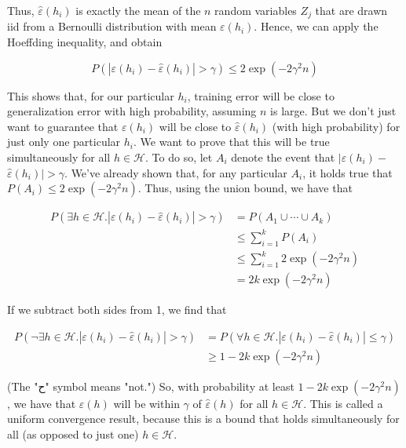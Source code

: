 \documentclass[10pt]{article}
\begin{document}
Thus, \(\hat{\varepsilon}\left(h_{i}\right)\) is exactly the mean of the \(n\) random variables \(Z_{j}\) that are drawn iid from a Bernoulli distribution with mean \(\varepsilon\left(h_{i}\right)\). Hence, we can apply the Hoeffding inequality, and obtain

\[
P\left(\left|\varepsilon\left(h_{i}\right)-\hat{\varepsilon}\left(h_{i}\right)\right|>\gamma\right) \leq 2 \exp \left(-2 \gamma^{2} n\right)
\]

This shows that, for our particular \(h_{i}\), training error will be close to generalization error with high probability, assuming \(n\) is large. But we don't just want to guarantee that \(\varepsilon\left(h_{i}\right)\) will be close to \(\hat{\varepsilon}\left(h_{i}\right)\) (with high probability) for just only one particular \(h_{i}\). We want to prove that this will be true simultaneously for all \(h \in \mathcal{H}\). To do so, let \(A_{i}\) denote the event that \(\mid \varepsilon\left(h_{i}\right)-\) \(\hat{\varepsilon}\left(h_{i}\right) \mid>\gamma\). We've already shown that, for any particular \(A_{i}\), it holds true that \(P\left(A_{i}\right) \leq 2 \exp \left(-2 \gamma^{2} n\right)\). Thus, using the union bound, we have that

\[
\begin{aligned}
P\left(\exists h \in \mathcal{H} .\left|\varepsilon\left(h_{i}\right)-\hat{\varepsilon}\left(h_{i}\right)\right|>\gamma\right) & =P\left(A_{1} \cup \cdots \cup A_{k}\right) \\
& \leq \sum_{i=1}^{k} P\left(A_{i}\right) \\
& \leq \sum_{i=1}^{k} 2 \exp \left(-2 \gamma^{2} n\right) \\
& =2 k \exp \left(-2 \gamma^{2} n\right)
\end{aligned}
\]

If we subtract both sides from 1, we find that

\[
\begin{aligned}
P\left(\neg \exists h \in \mathcal{H} .\left|\varepsilon\left(h_{i}\right)-\hat{\varepsilon}\left(h_{i}\right)\right|>\gamma\right) & =P\left(\forall h \in \mathcal{H} .\left|\varepsilon\left(h_{i}\right)-\hat{\varepsilon}\left(h_{i}\right)\right| \leq \gamma\right) \\
& \geq 1-2 k \exp \left(-2 \gamma^{2} n\right)
\end{aligned}
\]

(The "ح" symbol means "not.") So, with probability at least \(1-2 k \exp \left(-2 \gamma^{2} n\right)\), we have that \(\varepsilon(h)\) will be within \(\gamma\) of \(\hat{\varepsilon}(h)\) for all \(h \in \mathcal{H}\). This is called a uniform convergence result, because this is a bound that holds simultaneously for all (as opposed to just one) \(h \in \mathcal{H}\).
\end{document}
